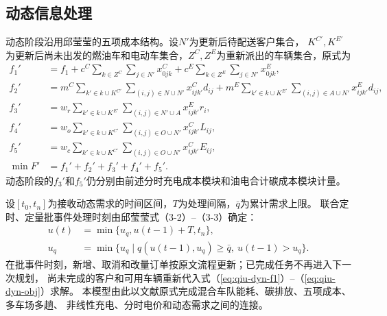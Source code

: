 \subsection{动态信息处理}

动态阶段沿用邱莹莹\cite{ref:71}的五项成本结构。设$N'$为更新后待配送客户集合，
$K^{C'},K^{E'}$为更新后尚未出发的燃油车和电动车集合，$Z^C,Z^E$为重新派出的车辆集合，原式为
\begin{align}
f_1'&=f_1+c^C\sum_{k\in Z^C}\sum_{j\in N'}x_{0jk}^C
+c^E\sum_{k\in Z^E}\sum_{j\in N'}x_{0jk}^E,
\label{eq:qiu-dyn-f1}\\
f_2'&=m^C\sum_{k'\in k\cup K^{C'}}\sum_{(i,j)\in N\cup N'}x_{ijk'}^Cd_{ij}
+m^E\sum_{k'\in k\cup K^{E'}}\sum_{(i,j)\in A\cup N'}x_{ijk'}^Ed_{ij},
\label{eq:qiu-dyn-f2}\\
f_3'&=w_r\sum_{k'\in k\cup K^{E'}}\sum_{(i,j)\in N'\cup A}x_{ijk'}^Er_i,
\label{eq:qiu-dyn-f3}\\
f_4'&=w_o\sum_{k'\in k\cup K^{C'}}\sum_{(i,j)\in O\cup N'}x_{ijk'}^CL_{ij},
\label{eq:qiu-dyn-f4}\\
f_5'&=w_c\sum_{k'\in k\cup K^{C'}}\sum_{(i,j)\in O\cup N'}x_{ijk'}^CE_{ij},
\label{eq:qiu-dyn-f5}\\
\min F'&=f_1'+f_2'+f_3'+f_4'+f_5'.
\label{eq:qiu-dyn-obj}
\end{align}
动态阶段的$f_3'$和$f_5'$仍分别由前述分时充电成本模块和油电合计碳成本模块计量。

设$[t_0,t_n]$为接收动态需求的时间区间，$T$为处理间隔，$\bar q$为累计需求上限。
联合定时、定量批事件处理时刻由邱莹莹式（3-2）--（3-3）确定：
\begin{align}
u(t)&=\min\{u_q,u(t-1)+T,t_n\},
\label{eq:qiu-trigger-time}\\
u_q&=\min\{u_q\mid q(u(t-1),u_q)\ge\bar q,\ u(t-1)>u_q\}.
\label{eq:qiu-trigger-quantity}
\end{align}
在批事件时刻，新增、取消和改量订单按原文流程更新；已完成任务不再进入下一次规划，
尚未完成的客户和可用车辆重新代入式（\ref{eq:qiu-dyn-f1}）--（\ref{eq:qiu-dyn-obj}）求解。
本模型由此以文献原式完成混合车队能耗、碳排放、五项成本、多车场多趟、
非线性充电、分时电价和动态需求之间的连接。
